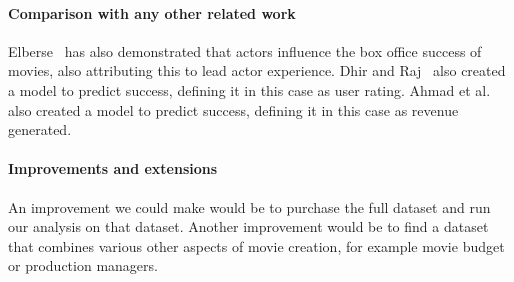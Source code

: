\begin{multicols}{2}
        \paragraph{Comparison with any other related work}
            Elberse~\cite{elberse2007power} has also demonstrated that actors influence the
                box office success of movies, also attributing this to lead actor experience.
            Dhir and Raj~\cite{dhirRaj} also created a model to predict success, defining
                it in this case as user rating.
            Ahmad et al.~\cite{ahmadDuraisamyYousefBuckles} also created a model to predict
                success, defining it in this case as revenue generated.

        \paragraph{Improvements and extensions}
            An improvement we could make would be to purchase the full dataset and run our
                analysis on that dataset.
            Another improvement would be to find a dataset that combines various other
                aspects of movie creation, for example movie budget or production managers.

    \end{multicols}

